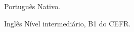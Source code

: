 

\begin{cvskills}

  \cvskill
    {Português} %
    {Nativo.} %

  \cvskill
    {Inglês} %
    {Nível intermediário, B1 do CEFR.} %
    


\end{cvskills}




